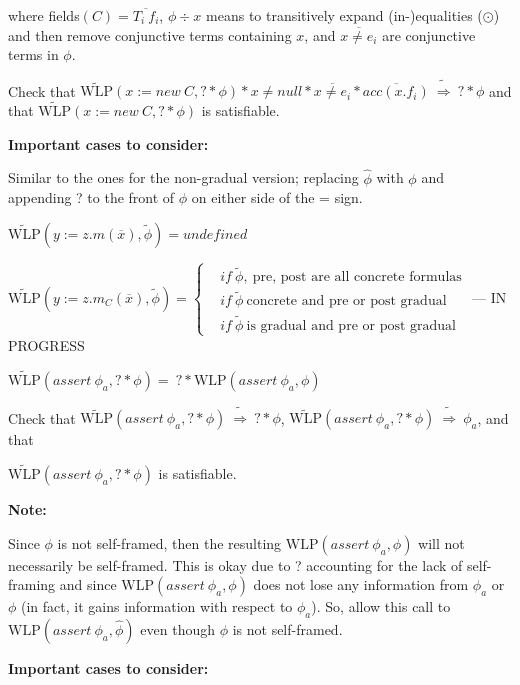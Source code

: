 \documentclass {article}
\newcommand{\fphi}{\widehat{\phi}}
\newcommand{\tphi}{\widetilde{\phi}}
\newcommand{\timp}{\ \widetilde{\Rightarrow}\ }
\newcommand{\wlp}[2]{\text{WLP}(#1,#2)}
\newcommand{\twlp}[2]{\widetilde{\text{WLP}}(#1,#2)}
\begin{document}
where fields$(C) = \overline{T_i \ f_i}$, $\phi \div x$ means to transitively expand (in-)equalities ($\odot$) and then remove conjunctive terms containing $x$, and $\overline{x \neq e_i}$ are conjunctive terms in $\phi$. 

Check that $\twlp{x := new\ C}{? \ast \phi} \ast x \neq null \ast \overline{x \neq e_i} \ast \overline{acc(x.f_i)} \timp ? \ast \phi$ and that $\twlp{x := new\ C}{? \ast \phi}$ is satisfiable.

\textbf{Important cases to consider:}

Similar to the ones for the non-gradual version; replacing $\fphi$ with $\phi$ and appending ? to the front of $\phi$ on either side of the = sign.

\vspace{0.5cm}

$\twlp{y := z.m(\overline{x})}{\tphi} = undefined$

\vspace{0.5cm}

$\twlp{y := z.m_C(\overline{x})}{\tphi} = 
	\begin{cases}
		& if \ \tphi, \ \text{pre, post are all concrete formulas} \\
		& if \ \tphi \ \text{concrete and pre or post gradual} \\
		& if \ \tphi \ \text{is gradual and pre or post gradual}
	\end{cases}
$ --- IN PROGRESS

\vspace{0.5cm}

$\twlp{assert\ \phi_a}{? \ast \phi} = \ ? \ast \wlp{assert\ \phi_a}{\phi}$

Check that $\twlp{assert\ \phi_a}{? \ast \phi} \timp ? \ast \phi$, $\twlp{assert\ \phi_a}{? \ast \phi} \timp \phi_a$, and that 

\noindent $\twlp{assert\ \phi_a}{? \ast \phi}$ is satisfiable.

\textbf{Note:}

Since $\phi$ is not self-framed, then the resulting $\wlp{assert\ \phi_a}{\phi}$ will not necessarily be self-framed. This is okay due to ? accounting for the lack of self-framing and since $\wlp{assert\ \phi_a}{\phi}$ does not lose any information from $\phi_a$ or $\phi$ (in fact, it gains information with respect to $\phi_a$). So, allow this call to $\wlp{assert\ \phi_a}{\fphi}$ even though $\phi$ is not self-framed.

\textbf{Important cases to consider:}
\end{document}
